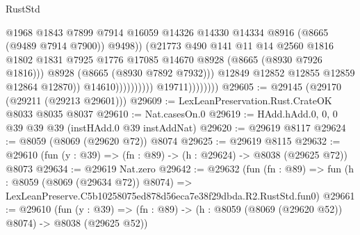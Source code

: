 \begin{lexlean}{RustStd}
\begin{coremodule}
                                                  @1968
                                                  @1843
                                                  @7899
                                                  @7914
                                                  @16059
                                                  @14326
                                                  @14330
                                                  @14334
                                                  @8916
                                                  (@8665 (@9489 @7914 @7900))
                                                  @9498))
                                              (@21773
                                                @490
                                                @141
                                                @11
                                                @14
                                                @2560
                                                @1816
                                                @1802
                                                @1831
                                                @7925
                                                @1776
                                                @17085
                                                @14670
                                                @8928
                                                (@8665 (@8930 @7926 @1816)))
                                              @8928
                                              (@8665 (@8930 @7892 @7932)))
                                            @12849
                                            @12852
                                            @12855
                                            @12859
                                            @12864
                                            @12870))
                                        @14610))))))))))
                    @19711))))))))
@29605 := @29145 (@29170 (@29211 (@29213 @29601)))
@29609 := LexLeanPreservation.Rust.CrateOK @8033 @8035 @8037
@29610 := Nat.casesOn.{0}
@29619 := HAdd.hAdd.{0, 0, 0} @39 @39 @39 (instHAdd.{0} @39 instAddNat)
@29620 := @29619 @8117
@29624 := @8059 (@8069 (@29620 @72)) @8074
@29625 := @29619 @8115
@29632 := @29610 (fun (y : @39) => (fn : @89) -> (h : @29624) -> @8038 (@29625 @72)) @8073
@29634 := @29619 Nat.zero
@29642 := @29632
    (fun (fn : @89) =>
    fun (h : @8059 (@8069 (@29634 @72)) @8074) =>
    LexLeanPreserve.C5b10258075ed878d56eca7e38f29dbda.R2.RustStd.fun0)
@29661 := @29610
    (fun (y : @39) => (fn : @89) -> (h : @8059 (@8069 (@29620 @52)) @8074) -> @8038 (@29625 @52))

\end{coremodule}
\end{lexlean}

